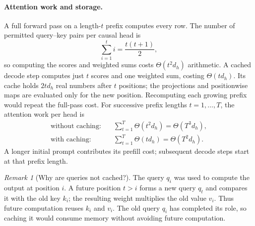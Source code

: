\documentclass[11pt,twoside]{article}
\theoremstyle{plain}
\theoremstyle{definition}
\theoremstyle{remark}
\newtheorem{remark}{Remark}[section]
\begin{document}
\paragraph{Attention work and storage.}
A full forward pass on a length-$t$ prefix computes every row. The number
of permitted query--key pairs per causal head is
\begin{equation}
\sum_{i=1}^t i=\frac{t(t+1)}2,
\end{equation}
so computing the scores and weighted sums costs $\Theta(t^2d_h)$ arithmetic.
A cached decode step computes just $t$ scores and one weighted sum, costing
$\Theta(td_h)$. Its cache holds $2td_h$ real numbers after $t$ positions;
the projections and positionwise maps are evaluated only for the new position.
Recomputing each growing prefix would repeat the full-pass cost. For
successive prefix lengths $t=1,\ldots,T$, the attention work per head is
\begin{equation}
\begin{aligned}
\text{without caching:}\quad &\sum_{t=1}^T\Theta(t^2d_h)=\Theta(T^3d_h),\\
\text{with caching:}\quad &\sum_{t=1}^T\Theta(td_h)=\Theta(T^2d_h).
\end{aligned}
\end{equation}
A longer initial prompt contributes its prefill cost; subsequent decode
steps start at that prefix length.

\begin{remark}[Why are queries not cached?]
\label{rem:uncached-queries}
The query $q_i$ was used to compute the output at position $i$. A future
position $t>i$ forms a new query $q_t$ and compares it with the old key $k_i$;
the resulting weight multiplies the old value $v_i$. Thus future computation
reuses $k_i$ and $v_i$. The old query $q_i$ has completed its role, so caching
it would consume memory without avoiding future computation.
\end{remark}
\end{document}
